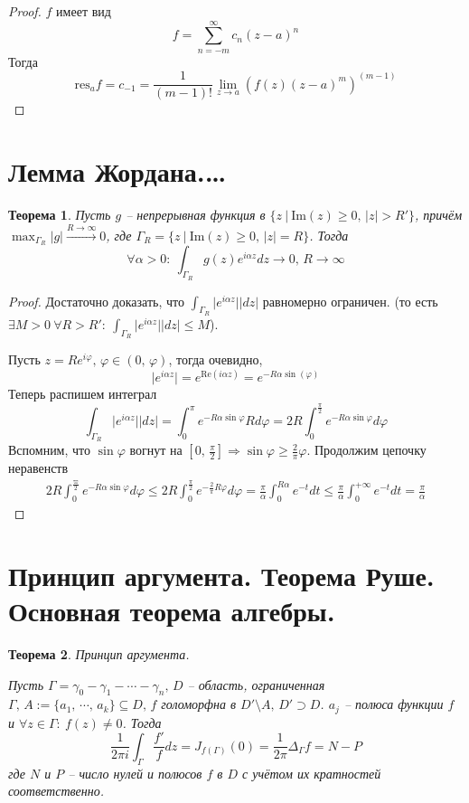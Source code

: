 \documentclass[a4paper,12pt]{article}
\renewcommand{\phi}{\ensuremath{\varphi}}
\renewcommand{\leq}{\ensuremath{\leqslant}}
\renewcommand{\geq}{\ensuremath{\geqslant}}
\theoremstyle{plain}
\newtheorem{theorem}{Теорема}[section]
\theoremstyle{definition}
\theoremstyle{remark}
\begin{document}
\begin{proof}
	$f$ имеет вид
	\[
		f = \sum_{n = -m}^\infty c_{n}(z - a)^n
	\]
	Тогда
	\[
		\text{res}_af = c_{-1} = \frac{1}{(m - 1)!}\lim_{z \to a}\left(f(z)(z - a)^m\right)^{(m - 1)}
	\]
\end{proof}

\section{Лемма Жордана.\dots}
\begin{theorem}
	Пусть $g$ -- непрерывная функция в $\{z \:\vert\: \text{Im}(z) \geq 0,\, \vert z\vert > R'\}$, причём $\max_{\Gamma_R}\vert g\vert \overset{R \to \infty}{\to} 0$, где $\Gamma_R = \{z \:\vert\: \text{Im}(z) \geq 0,\, \vert z\vert = R\}$. Тогда
	\[
		\forall \alpha > 0 :\: \int_{\Gamma_R} g(z)e^{i\alpha z}dz \to 0,\, R \to \infty
	\]
\end{theorem}

\begin{proof}
	Достаточно доказать, что $\int_{\Gamma_R}\vert e^{i\alpha z}\vert\vert dz\vert$ равномерно ограничен. (то есть $\exists M > 0 \: \forall R > R' :\: \int_{\Gamma_R}\vert e^{i\alpha z}\vert\vert dz\vert \leq M$).

	Пусть $z = Re^{i\phi},\, \phi \in (0,\, \phi)$, тогда очевидно,
	\[
		\vert e^{i\alpha z}\vert = e^{\text{Re}(i\alpha z)} = e^{-R\alpha\sin(\phi)}
	\]
	Теперь распишем интеграл
	\[
		\int_{\Gamma_R}\vert e^{i\alpha z}\vert\vert dz\vert = \int_0^\pi e^{-R\alpha\sin\phi}Rd\phi = 2R\int_0^{\frac{\pi}{2}}e^{-R\alpha\sin\phi}d\phi
	\]
	Вспомним, что $\sin\phi$ вогнут на $[0,\, \frac{\pi}{2}] \Rightarrow \sin\phi \geq \frac{2}{\pi}\phi$. Продолжим цепочку неравенств
	\begin{align*}
		2R\int_0^{\frac{\varpi}{2}}e^{-R\alpha\sin\phi}d\phi \leq 2R\int_0^{\frac{\pi}{2}}e^{-\frac{2}{\pi}R\phi}d\phi = \frac{\pi}{\alpha}\int_0^{R\alpha}e^{-t}dt \leq \frac{\pi}{\alpha}\int_0^{+\infty}e^{-t}dt = \frac{\pi}{\alpha}
	\end{align*}
\end{proof}

\section{Принцип аргумента. Теорема Руше. Основная теорема алгебры.}
\begin{theorem}
	Принцип аргумента.

	Пусть $\Gamma = \gamma_0 - \gamma_1 - \cdots - \gamma_n,\, D$ -- область, ограниченная $\Gamma,\, A := \{a_1,\,\cdots,\, a_k\} \subseteq D,\, f$ голоморфна в $D' \setminus A,\, D' \supset D$. $a_j$ -- полюса функции $f$ и $\forall z \in \Gamma :\: f(z) \neq 0$. Тогда
	\[
		\frac{1}{2\pi i}\int_\Gamma\frac{f'}{f}dz = J_{f(\Gamma)}(0) = \frac{1}{2\pi}\Delta_\Gamma f = N - P
	\]
	где $N$ и $P$ -- число нулей и полюсов $f$ в $D$ с учётом их кратностей соответственно.
\end{theorem}
\end{document}
